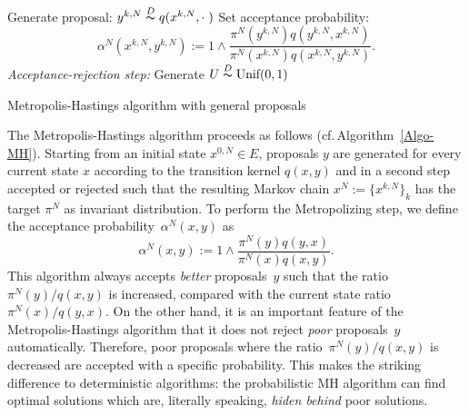 \IncMargin{1em}
\begin{algorithm}[htb]
\DontPrintSemicolon


\BlankLine

{
  Generate proposal: $ y^{k,N} \stackrel{D}{\thicksim} q(x^{k,N}, \cdot \;) $\;
  Set acceptance probability:
  \begin{equation*}
   \alpha^{N} ( x^{k,N}, y^{k,N} ) := 1 \wedge \dfrac{\pi^{N}(y^{k,N}) q(y^{k,N},x^{k,N}) }{\pi^{N}(x^{k,N}) q(x^{k,N},y^{k,N})}.    
  \end{equation*}\label{MHAlgo-AcceptanceProba}
  \emph{Acceptance-rejection step:}\;
  Generate $ U \stackrel{D}{\thicksim} \text{Unif}(0,1) $\;

}
\caption{Metropolis-Hastings algorithm with general proposals}\label{Algo-MH}
\end{algorithm}\DecMargin{1em}

The Metropolis-Hastings algorithm proceeds as follows (cf.\,Algorithm~\ref{Algo-MH}). Starting from an initial state $ x^{0,N} \in E $,  proposals $y$ are generated for every current state $x$ according to the transition kernel $ q (x, y) $ and in a second step accepted or rejected such that the resulting Markov chain $ x^{N} := \{ x^{k,N} \}_{k} $ has the target $ \pi^{N} $ as invariant distribution. To perform the Metropolizing step, we define the acceptance probability~$\alpha^N(x, y)$ as
\begin{equation}
 \label{MH-Acceptance probability definition}
 \alpha^{N}(x,y)  := 1 \wedge \dfrac{\pi^{N}(y) q(y,x) }{\pi^{N}(x) q(x,y)}.
\end{equation}
This algorithm always accepts \textit{better} proposals~$y$ such that the ratio~$ \pi^{N}(y) / q(x,y) $ is increased, compared with the current state ratio~$ \pi^{N}(x) / q(y,x) $. On the other hand, it is an important feature of the Metropolis-Hastings algorithm that it does not reject \textit{poor} proposals~$y$ automatically. Therefore, poor proposals where the ratio~$ \pi^{N}(y) / q(x,y) $ is decreased are accepted with a specific probability. This makes the striking difference to deterministic algorithms: the probabilistic MH algorithm can find optimal solutions which are, literally speaking, \textit{hiden behind} poor solutions.

